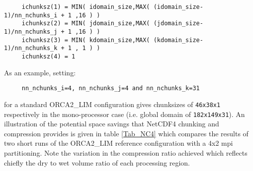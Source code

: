 \documentclass[NEMO_book]{subfiles}
\begin{document}
\vspace{-20pt}
\begin{alltt}  {{\scriptsize 
\begin{verbatim}
     ichunksz(1) = MIN( idomain_size,MAX( (idomain_size-1)/nn_nchunks_i + 1 ,16 ) )
     ichunksz(2) = MIN( jdomain_size,MAX( (jdomain_size-1)/nn_nchunks_j + 1 ,16 ) )
     ichunksz(3) = MIN( kdomain_size,MAX( (kdomain_size-1)/nn_nchunks_k + 1 , 1 ) )
     ichunksz(4) = 1
\end{verbatim}
}}\end{alltt} 

\noindent As an example, setting:
\vspace{-20pt}
\begin{alltt}  {{\scriptsize
\begin{verbatim}
     nn_nchunks_i=4, nn_nchunks_j=4 and nn_nchunks_k=31
\end{verbatim}
}}\end{alltt} \vspace{-10pt}

\noindent for a standard ORCA2\_LIM configuration gives chunksizes of {\small\tt 46x38x1}
respectively in the mono-processor case (i.e. global domain of {\small\tt 182x149x31}).
An illustration of the potential space savings that NetCDF4 chunking and compression
provides is given in table \ref{Tab_NC4} which compares the results of two short
runs of the ORCA2\_LIM reference configuration with a 4x2 mpi partitioning. Note
the variation in the compression ratio achieved which reflects chiefly the dry to wet 
volume ratio of each processing region.
\end{document}
